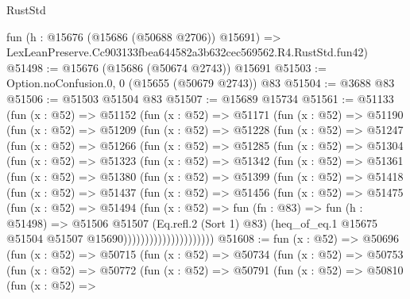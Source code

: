 \begin{lexlean}{RustStd}
\begin{coremodule}
    fun (h : @15676 (@15686 (@50688 @2706)) @15691) =>
    LexLeanPreserve.Cc903133fbea644582a3b632cec569562.R4.RustStd.fun42)
@51498 := @15676 (@15686 (@50674 @2743)) @15691
@51503 := Option.noConfusion.{0, 0} (@15655 (@50679 @2743)) @83
@51504 := @3688 @83
@51506 := @51503 @51504 @83
@51507 := @15689 @15734
@51561 := @51133
    (fun (x : @52) =>
    @51152
      (fun (x : @52) =>
      @51171
        (fun (x : @52) =>
        @51190
          (fun (x : @52) =>
          @51209
            (fun (x : @52) =>
            @51228
              (fun (x : @52) =>
              @51247
                (fun (x : @52) =>
                @51266
                  (fun (x : @52) =>
                  @51285
                    (fun (x : @52) =>
                    @51304
                      (fun (x : @52) =>
                      @51323
                        (fun (x : @52) =>
                        @51342
                          (fun (x : @52) =>
                          @51361
                            (fun (x : @52) =>
                            @51380
                              (fun (x : @52) =>
                              @51399
                                (fun (x : @52) =>
                                @51418
                                  (fun (x : @52) =>
                                  @51437
                                    (fun (x : @52) =>
                                    @51456
                                      (fun (x : @52) =>
                                      @51475
                                        (fun (x : @52) =>
                                        @51494
                                          (fun (x : @52) =>
                                          fun (fn : @83) =>
                                          fun (h : @51498) =>
                                          @51506
                                            @51507
                                            (Eq.refl.{2} (Sort 1) @83)
                                            (heq_of_eq.{1}
                                              @15675
                                              @51504
                                              @51507
                                              @15690)))))))))))))))))))))
@51608 := fun (x : @52) =>
  @50696
    (fun (x : @52) =>
    @50715
      (fun (x : @52) =>
      @50734
        (fun (x : @52) =>
        @50753
          (fun (x : @52) =>
          @50772
            (fun (x : @52) =>
            @50791
              (fun (x : @52) =>
              @50810
                (fun (x : @52) =>

\end{coremodule}
\end{lexlean}
